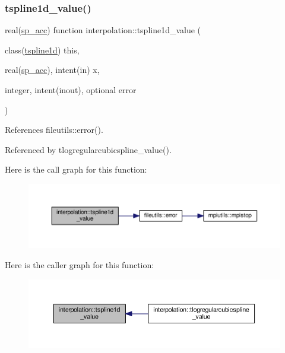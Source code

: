 \subsubsection{\texorpdfstring{tspline1d\+\_\+value()}{tspline1d\_value()}}
{\footnotesize\ttfamily real(\mbox{\hyperlink{namespaceinterpolation_af72aa9a05feb8ef90b2d26e4a013abf3}{sp\+\_\+acc}}) function interpolation\+::tspline1d\+\_\+value (\begin{DoxyParamCaption}\item[{class(\mbox{\hyperlink{structinterpolation_1_1tspline1d}{tspline1d}})}]{this,  }\item[{real(\mbox{\hyperlink{namespaceinterpolation_af72aa9a05feb8ef90b2d26e4a013abf3}{sp\+\_\+acc}}), intent(in)}]{x,  }\item[{integer, intent(inout), optional}]{error }\end{DoxyParamCaption})}



References fileutils\+::error().



Referenced by tlogregularcubicspline\+\_\+value().

Here is the call graph for this function\+:
\nopagebreak
\begin{figure}[H]
\begin{center}
\leavevmode
\includegraphics[width=350pt]{namespaceinterpolation_a7a675d7e22aea0d85c1c2241ee6c221f_cgraph}
\end{center}
\end{figure}
Here is the caller graph for this function\+:
\nopagebreak
\begin{figure}[H]
\begin{center}
\leavevmode
\includegraphics[width=350pt]{namespaceinterpolation_a7a675d7e22aea0d85c1c2241ee6c221f_icgraph}
\end{center}
\end{figure}
\mbox{\label{namespaceinterpolation_a1046109eeab848ab2641b54b30004885}} 
